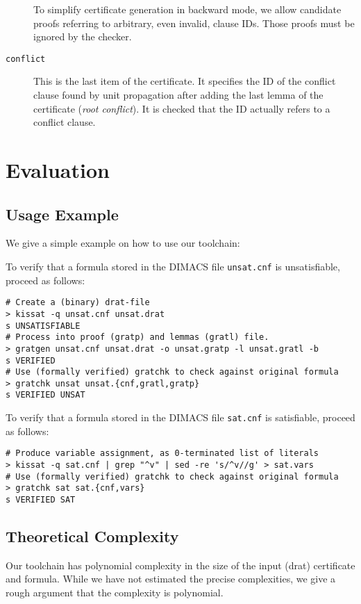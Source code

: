 \documentclass{llncs}     %
\begin{document}
\begin{description}
      To simplify certificate generation in backward mode, we allow candidate proofs referring to arbitrary, even invalid, clause IDs. Those proofs must be ignored by the checker.
    \item[\tt conflict] This is the last item of the certificate. It specifies the ID of the conflict clause found by unit propagation after adding the last
    lemma of the certificate (\emph{root conflict}). It is checked that the ID actually refers to a conflict clause.
\end{description}


\section{Evaluation}

\subsection{Usage Example}
We give a simple example on how to use our toolchain:

To verify that a formula stored in the DIMACS file {\tt unsat.cnf} is unsatisfiable, proceed as follows:
\begin{verbatim}
# Create a (binary) drat-file
> kissat -q unsat.cnf unsat.drat
s UNSATISFIABLE
# Process into proof (gratp) and lemmas (gratl) file.
> gratgen unsat.cnf unsat.drat -o unsat.gratp -l unsat.gratl -b
s VERIFIED
# Use (formally verified) gratchk to check against original formula
> gratchk unsat unsat.{cnf,gratl,gratp}
s VERIFIED UNSAT
\end{verbatim}

To verify that a formula stored in the DIMACS file {\tt sat.cnf} is satisfiable, proceed as follows:
\begin{verbatim}
# Produce variable assignment, as 0-terminated list of literals
> kissat -q sat.cnf | grep "^v" | sed -re 's/^v//g' > sat.vars
# Use (formally verified) gratchk to check against original formula
> gratchk sat sat.{cnf,vars}
s VERIFIED SAT
\end{verbatim}


\subsection{Theoretical Complexity}
Our toolchain has polynomial complexity in the size of the input (drat) certificate and formula.
While we have not estimated the precise complexities, we give a rough argument that the complexity is polynomial.
\end{document}
